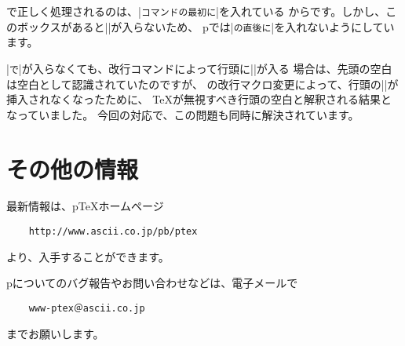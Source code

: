 \documentclass{plnews}
\begin{document}
\LaTeXe{}で正しく処理されるのは、|\verb|コマンドの最初に|\hbox{}|を入れている
からです。しかし、このボックスがあると|\xkanjiskip|が入らないため、
p\LaTeXe{}では|\verb|の直後に|\hbox{}|を入れないようにしています。

|\verb|で|\hbox{}|が入らなくても、改行コマンドによって行頭に|\mbox{}|が入る
場合は、先頭の空白は空白として認識されていたのですが、
\LaTeXe{}の改行マクロ変更によって、行頭の|\mbox{}|が挿入されなくなったために、
\TeX{}が無視すべき行頭の空白と解釈される結果となっていました。
今回の対応で、この問題も同時に解決されています。

\section{その他の情報}
最新情報は、p\TeX{}ホームページ
\begin{verbatim}
    http://www.ascii.co.jp/pb/ptex
\end{verbatim}
より、入手することができます。

p\LaTeXe{}についてのバグ報告やお問い合わせなどは、電子メールで
\begin{verbatim}
    www-ptex＠ascii.co.jp
\end{verbatim}
までお願いします。
\end{document}
